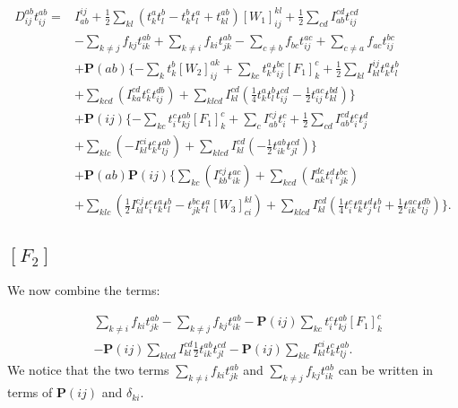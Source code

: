 \begin{align}
D_{ij}^{ab} t_{ij}^{ab} = & 
I_{ab}^{ij}
+ \frac{1}{2} \sum_{kl} (t_k^a t_l^b - t_k^b t_l^a + t_{kl}^{ab}) [W_1]_{ij}^{kl}
+ \frac{1}{2} \sum_{cd} I_{ab}^{cd} t_{ij}^{cd}
 \nonumber \\ &
- \sum_{k \not= j} f_{kj} t_{ik}^{ab} 
+ \sum_{k \not= i} f_{ki} t_{jk}^{ab}
- \sum_{c \not= b} f_{bc} t_{ij}^{ac}
+ \sum_{c \not= a} f_{ac} t_{ij}^{bc}
 \nonumber \\ &
+ \textbf{P}(ab) 
\{
- \sum_k t_k^b [W_2]_{ij}^{ak}
+ \sum_{kc} t_k^a t_{ij}^{bc} [F_1]_k^c
+ \frac{1}{2} \sum_{kl} I_{kl}^{ij} t_k^a t_l^b 
\nonumber \\ &
+ \sum_{kcd} 
(
I_{ka}^{cd} t_k^c t_{ij}^{db} 
)
+ \sum_{klcd} I_{kl}^{cd} 
(
\frac{1}{4} t_k^a t_l^b t_{ij}^{cd} 
- \frac{1}{2} t_{ij}^{ac} t_{kl}^{bd}
)
\}
\nonumber \\ &
+ \textbf{P}(ij)
\{
- \sum_{kc} t_i^c t_{kj}^{ab} [F_1]_k^c
+ \sum_c I_{ab}^{cj} t_i^c
+ \frac{1}{2} \sum_{cd} I_{ab}^{cd} t_i^c t_j^d 
\nonumber \\ &
+ \sum_{klc}
( 
- I_{kl}^{ci} t_k^c t_{lj}^{ab}
)
+ \sum_{klcd} I_{kl}^{cd}
(
- \frac{1}{2} t_{ik}^{ab} t_{jl}^{cd}
)
\}
\nonumber \\ &
+ \textbf{P}(ab) \textbf{P}(ij)
\{
\sum_{kc}
(
I_{kb}^{cj} t_{ik}^{ac}
)
+ \sum_{kcd}
(
I_{ak}^{dc} t_i^d t_{jk}^{bc}
)
\nonumber \\ &
+ \sum_{klc}
(
\frac{1}{2} I_{kl}^{cj} t_i^c t_k^a t_l^b
- t_{jk}^{bc} t_l^a [W_3]_{ci}^{kl}
)
+ \sum_{klcd} I_{kl}^{cd}
(
\frac{1}{4} t_i^c t_k^a t_j^d t_l^b
+ \frac{1}{2} t_{ik}^{ac} t_{lj}^{db} 
)
\} .
\end{align}

\subsection{$[F_2]$}
We now combine the terms:

\begin{align}
& \sum_{k \not= i} f_{ki} t_{jk}^{ab}
- \sum_{k \not= j} f_{kj} t_{ik}^{ab} 
- \textbf{P}(ij) \sum_{kc} t_i^c t_{kj}^{ab} [F_1]_k^c
\nonumber \\ &
- \textbf{P}(ij) \sum_{klcd} I_{kl}^{cd} \frac{1}{2} t_{ik}^{ab} t_{jl}^{cd}
- \textbf{P}(ij) \sum_{klc} I_{kl}^{ci} t_k^c t_{lj}^{ab} .
\end{align}
We notice that the two terms $\sum_{k \not= i} f_{ki} t_{jk}^{ab}$ and $\sum_{k \not= j} f_{kj} t_{ik}^{ab}$ can be written in terms of $\textbf{P}(ij)$ and $\delta_{ki}$.

